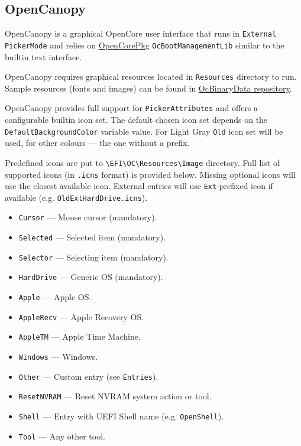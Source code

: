 \documentclass[]{article}
\providecommand{\tightlist}{%
  \setlength{\itemsep}{0pt}\setlength{\parskip}{0pt}}
\begin{document}
\subsection{OpenCanopy}\label{ueficanopy}

OpenCanopy is a graphical OpenCore user interface that runs in
\texttt{External} \texttt{PickerMode} and relies on
\href{https://github.com/acidanthera/OpenCorePkg}{OpenCorePkg} \texttt{OcBootManagementLib}
similar to the builtin text interface.

OpenCanopy requires graphical resources located in \texttt{Resources} directory to run.
Sample resources (fonts and images) can be found in
\href{https://github.com/acidanthera/OcBinaryData}{OcBinaryData repository}.

OpenCanopy provides full support for \texttt{PickerAttributes} and offers a configurable
builtin icon set. The default chosen icon set depends on the \texttt{DefaultBackgroundColor}
variable value. For Light Gray \texttt{Old} icon set will be used, for other colours ---
the one without a prefix.

Predefined icons are put to \texttt{\textbackslash EFI\textbackslash OC\textbackslash Resources\textbackslash Image}
directory. Full list of supported icons (in \texttt{.icns} format) is provided below. Missing optional
icons will use the closest available icon. External entries will use \texttt{Ext}-prefixed
icon if available (e.g. \texttt{OldExtHardDrive.icns}).

\begin{itemize}
\tightlist
  \item \texttt{Cursor} --- Mouse cursor (mandatory).
  \item \texttt{Selected} --- Selected item (mandatory).
  \item \texttt{Selector} --- Selecting item (mandatory).
  \item \texttt{HardDrive} --- Generic OS (mandatory).
  \item \texttt{Apple} --- Apple OS.
  \item \texttt{AppleRecv} --- Apple Recovery OS.
  \item \texttt{AppleTM} --- Apple Time Machine.
  \item \texttt{Windows} --- Windows.
  \item \texttt{Other} --- Custom entry (see \texttt{Entries}).
  \item \texttt{ResetNVRAM} --- Reset NVRAM system action or tool.
  \item \texttt{Shell} --- Entry with UEFI Shell name (e.g. \texttt{OpenShell}).
  \item \texttt{Tool} --- Any other tool.
\end{itemize}
\end{document}
